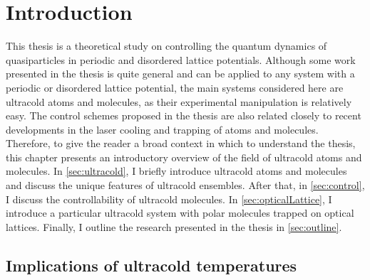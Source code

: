 
\chapter{Introduction}
\label{ch:Introduction}

This thesis is a theoretical study on controlling the quantum dynamics of quasiparticles in periodic and disordered lattice potentials. 
Although some work presented in the thesis is quite general and can be applied to any system with a periodic or disordered lattice potential, 
the main systems considered here are ultracold atoms and molecules, as their experimental manipulation is 
relatively easy. The control schemes proposed in the thesis are also related closely to recent developments in the laser 
cooling and trapping of atoms and molecules. Therefore, to give the reader a broad context in which to understand the 
thesis, this chapter presents an introductory overview of the field of ultracold atoms and molecules. In \autoref{sec:ultracold}, I briefly introduce ultracold  atoms and molecules and discuss the unique features of ultracold ensembles. After
that, in \autoref{sec:control}, I discuss the controllability of ultracold molecules. In
 \autoref{sec:opticalLattice}, I introduce a particular ultracold system with polar molecules trapped on optical lattices.  
Finally, I outline the research presented in the thesis in \autoref{sec:outline}. 

\section{Implications of ultracold temperatures}
\label{sec:ultracold}

